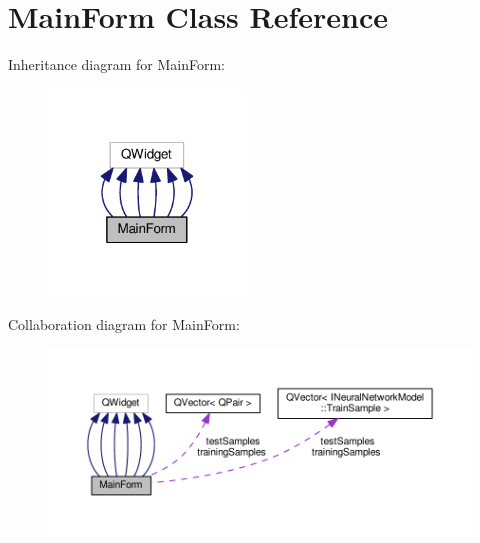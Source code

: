 \hypertarget{class_main_form}{}\section{Main\+Form Class Reference}
\label{class_main_form}


Inheritance diagram for Main\+Form\+:\nopagebreak
\begin{figure}[H]
\begin{center}
\leavevmode
\includegraphics[width=149pt]{class_main_form__inherit__graph}
\end{center}
\end{figure}


Collaboration diagram for Main\+Form\+:\nopagebreak
\begin{figure}[H]
\begin{center}
\leavevmode
\includegraphics[width=350pt]{class_main_form__coll__graph}
\end{center}
\end{figure}
